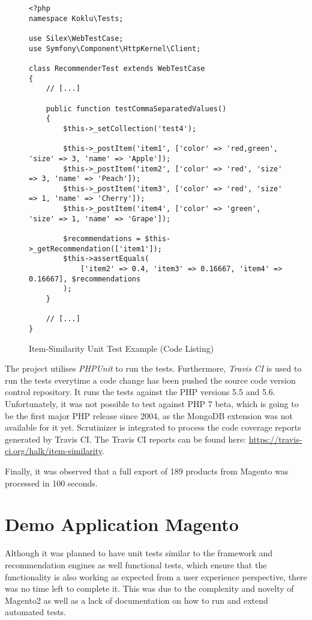 \begin{figure}[!ht]
    \begin{verbatim}
<?php
namespace Koklu\Tests;

use Silex\WebTestCase;
use Symfony\Component\HttpKernel\Client;

class RecommenderTest extends WebTestCase
{
    // [...]

    public function testCommaSeparatedValues()
    {
        $this->_setCollection('test4');

        $this->_postItem('item1', ['color' => 'red,green', 'size' => 3, 'name' => 'Apple']);
        $this->_postItem('item2', ['color' => 'red', 'size' => 3, 'name' => 'Peach']);
        $this->_postItem('item3', ['color' => 'red', 'size' => 1, 'name' => 'Cherry']);
        $this->_postItem('item4', ['color' => 'green', 'size' => 1, 'name' => 'Grape']);

        $recommendations = $this->_getRecommendation(['item1']);
        $this->assertEquals(
            ['item2' => 0.4, 'item3' => 0.16667, 'item4' => 0.16667], $recommendations
        );
    }

    // [...]
}
    \end{verbatim}
    \caption{Item-Similarity Unit Test Example (Code Listing)}
    \label{fig:testing-itemsimilarity-similarity}
\end{figure}

The project utilises \emph{PHPUnit} to run the tests. Furthermore, \emph{Travis CI} is used to run the tests everytime a code change has been pushed the source code version control repository. It runs the tests against the PHP versions 5.5 and 5.6. Unfortunately, it was not possible to test against PHP 7 beta, which is going to be the first major PHP release since 2004, as the MongoDB extension was not available for it yet. Scrutinizer is integrated to process the code coverage reports generated by Travis CI. The Travis CI reports can be found here: \url{https://travis-ci.org/halk/item-similarity}.

Finally, it was observed that a full export of 189 products from Magento was processed in 100 seconds.

\section{Demo Application Magento}

Although it was planned to have unit tests similar to the framework and recommendation engines as well functional tests, which ensure that the functionality is also working as expected from a user experience perspective, there was no time left to complete it. This was due to the complexity and novelty of Magento2 as well as a lack of documentation on how to run and extend automated tests.

